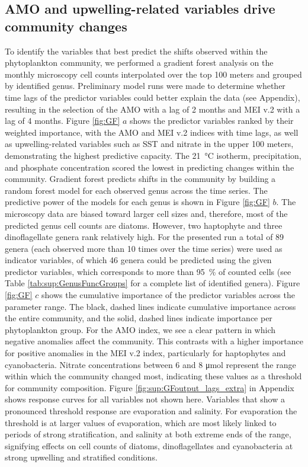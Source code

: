 \documentclass[draft]{agujournal2019}
\begin{document}
\subsection{AMO and upwelling-related variables drive community changes}
    To identify the variables that best predict the shifts observed within the phytoplankton community, we performed a gradient forest analysis on the monthly microscopy cell counts interpolated over the top 100 meters and grouped by identified genus. Preliminary model runs were made to determine whether time lags of the predictor variables could better explain the data (see Appendix), resulting in the selection of the AMO with a lag of 2 months and MEI v.2 with a lag of 4 months. Figure \ref{fig:GF} $a$ shows the predictor variables ranked by their weighted importance, with the AMO and MEI v.2 indices with time lags, as well as upwelling-related variables such as SST and nitrate in the upper 100 meters, demonstrating the highest predictive capacity. The \qty{21}{\celsius} isotherm, precipitation, and phosphate concentration scored the lowest in predicting changes within the community. Gradient forest predicts shifts in the community by building a random forest model for each observed genus across the time series. The predictive power of the models for each genus is shown in Figure \ref{fig:GF} $b$. The microscopy data are biased toward larger cell sizes and, therefore, most of the predicted genus cell counts are diatoms. However, two haptophyte and three dinoflagellate genera rank relatively high. For the presented run a total of 89 genera (each observed more than 10 times over the time series) were used as indicator variables, of which 46 genera could be predicted using the given predictor variables, which corresponds to more than \qty{95}{\%} of counted cells (see Table \ref{tab:sup:GenusFuncGroups} for a complete list of identified genera). 
    Figure \ref{fig:GF} $c$ shows the cumulative importance of the predictor variables across the parameter range. The black, dashed lines indicate cumulative importance across the entire community, and the solid, dashed lines indicate importance per phytoplankton group. For the AMO index, we see a clear pattern in which negative anomalies affect the community. This contrasts with a higher importance for positive anomalies in the MEI v.2 index, particularly for haptophytes and cyanobacteria. Nitrate concentrations between 6 and 8 \unit{\micro \mole} represent the range within which the community changed most, indicating these values as a threshold for community composition. Figure \ref{fig:sup:GFoutput_lags_extra} in Appendix shows response curves for all variables not shown here. Variables that show a pronounced threshold response are evaporation and salinity. For evaporation the threshold is at larger values of evaporation, which are most likely linked to periods of strong stratification, and salinity at both extreme ends of the range, signifying effects on cell counts of diatoms, dinoflagellates and cyanobacteria at strong upwelling and stratified conditions. 
    
\end{document}
